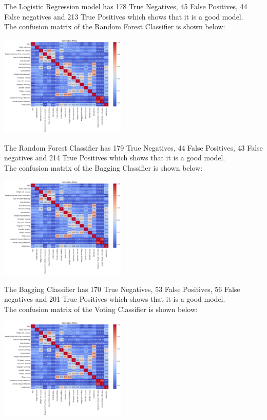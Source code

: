 \documentclass{article}
\begin{document}
The Logistic Regression model has 178 True Negatives, 45 False Positives, 44 False negatives and 213 True Positives which shows that it is a good model.\\
The confusion matrix of the Random Forest Classifier is shown below:\\
\begin{center}
        \includegraphics[width = 6cm]{1.png}
\end{center}



The Random Forest Classifier has 179 True Negatives, 44 False Positives, 43 False negatives and 214 True Positives which shows that it is a good model.\\
The confusion matrix of the Bagging Classifier is shown below:\\
\begin{center}
    \includegraphics[width = 6cm]{1.png}
\end{center}



The Bagging Classifier has 170 True Negatives, 53 False Positives, 56 False negatives and 201 True Positives which shows that it is a good model.\\
The confusion matrix of the Voting Classifier is shown below:\\
\begin{center}
    \includegraphics[width = 6cm]{1.png}
\end{center}
\end{document}
